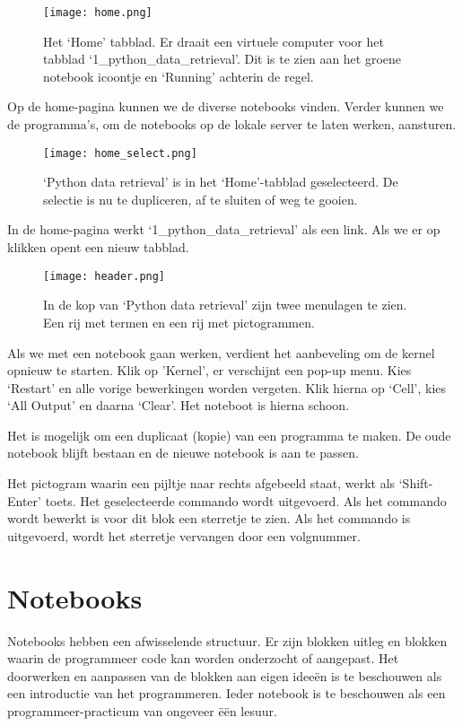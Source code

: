 \begin{figure}[H]
\texttt{[image: home.png]}
\caption{Het `Home' tabblad. Er draait een virtuele computer voor het tabblad `1\_python\_data\_retrieval'. Dit is te zien
aan het groene notebook icoontje en `Running' achterin de regel.}
\end{figure}

Op de home-pagina kunnen we de diverse notebooks vinden. Verder kunnen we de programma's, om de notebooks op de lokale server te laten werken, aansturen.

\begin{figure}[H]
\texttt{[image: home\_select.png]}
\caption{`Python data retrieval' is in het `Home'-tabblad geselecteerd. De selectie is nu te dupliceren, af te sluiten of weg te gooien.}
\end{figure}

In de home-pagina werkt `1\_python\_data\_retrieval' als een link. Als we er op klikken opent een nieuw tabblad.

\begin{figure}[H]
\texttt{[image: header.png]}
\caption{In de kop van `Python data retrieval' zijn twee menulagen te zien. Een rij met termen en een rij met pictogrammen.}
\end{figure}

Als we met een notebook gaan werken, verdient het aanbeveling om de kernel opnieuw te starten. Klik op 'Kernel', er verschijnt een pop-up menu. Kies `Restart' en alle vorige bewerkingen worden vergeten. Klik hierna op `Cell', kies `All Output' en daarna `Clear'. Het noteboot is hierna schoon.

Het is mogelijk om een duplicaat (kopie) van een programma te maken. De oude notebook blijft bestaan en de nieuwe notebook is aan te passen. 

Het pictogram waarin een pijltje naar rechts afgebeeld staat, werkt als `Shift-Enter' toets. Het geselecteerde commando wordt uitgevoerd. Als het commando wordt bewerkt is voor dit blok een sterretje te zien. Als het commando is uitgevoerd, wordt het sterretje vervangen door een volgnummer.

\section{Notebooks}

Notebooks hebben een afwisselende structuur. Er zijn blokken uitleg en blokken waarin de programmeer code kan worden onderzocht of aangepast. Het doorwerken en aanpassen van de blokken aan eigen idee\"{e}n is te beschouwen als een introductie van het programmeren. Ieder notebook is te beschouwen als een programmeer-practicum van ongeveer \"{e}\"{e}n lesuur.
 
